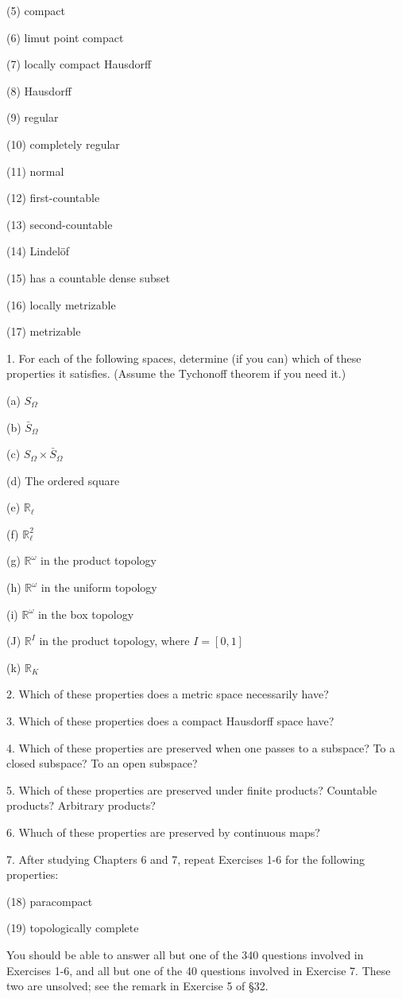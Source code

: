 \documentclass[10pt]{article}
\begin{document}
(5) compact

(6) limut point compact

(7) locally compact Hausdorff

(8) Hausdorff

(9) regular

(10) completely regular

(11) normal

(12) first-countable

(13) second-countable

(14) Lindelöf

(15) has a countable dense subset

(16) locally metrizable

(17) metrizable

1. For each of the following spaces, determine (if you can) which of these properties it satisfies. (Assume the Tychonoff theorem if you need it.)

(a) \({S}_{\Omega }\)

(b) \({\bar{S}}_{\Omega }\)

(c) \({S}_{\Omega } \times  {\bar{S}}_{\Omega }\)

(d) The ordered square

(e) \({\mathbb{R}}_{\ell }\)

(f) \({\mathbb{R}}_{\ell }^{2}\)

(g) \({\mathbb{R}}^{\omega }\) in the product topology

(h) \({\mathbb{R}}^{\omega }\) in the uniform topology

(i) \({\mathbb{R}}^{\omega }\) in the box topology

(J) \({\mathbb{R}}^{I}\) in the product topology, where \(I = \left\lbrack  {0,1}\right\rbrack\)

(k) \({\mathbb{R}}_{K}\)

2. Which of these properties does a metric space necessarily have?

3. Which of these properties does a compact Hausdorff space have?

4. Which of these properties are preserved when one passes to a subspace? To a closed subspace? To an open subspace?

5. Which of these properties are preserved under finite products? Countable products? Arbitrary products?

6. Whuch of these properties are preserved by continuous maps?

7. After studying Chapters 6 and 7, repeat Exercises 1-6 for the following properties:

(18) paracompact

(19) topologically complete

You should be able to answer all but one of the 340 questions involved in Exercises 1-6, and all but one of the 40 questions involved in Exercise 7. These two are unsolved; see the remark in Exercise 5 of §32.
\end{document}
